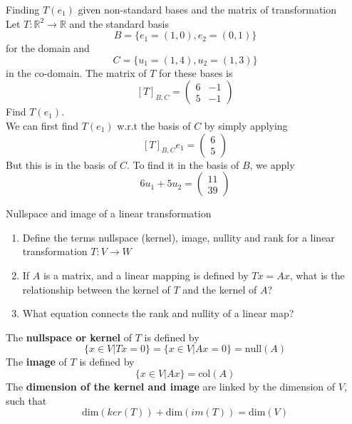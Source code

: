 \documentclass[journal, letterpaper]{IEEEtran}
\begin{document}
    \begin{myboxg}{Finding $T(e_1)$ given non-standard bases and the matrix of transformation} \\
        Let $T : \mathbb{R}^2 \to \mathbb{R}$ and the standard basis 
        $$ B = \{e_1 = (1, 0), e_2 = (0, 1) \}$$ for the domain and
        $$ C = \{u_1 = (1, 4), u_2 = (1, 3) \}$$
        in the co-domain. The matrix of $T$ for these bases is
        $$ [T]_{B, C} = \begin{pmatrix}
            6 & -1 \\5 & -1
        \end{pmatrix}$$
        Find $T(e_1)$.
        \newline \\ 
        We can first find $T(e_1)$ w.r.t the basis of $C$ by simply applying 
        $$ [T]_{B, C} e_1 = \begin{pmatrix}
            6 \\ 5
        \end{pmatrix}$$
        But this is in the basis of $C$. To find it in the basis of $B$, we apply
        $$ 6 u_1 + 5 u_2 = \begin{pmatrix}
            11 \\ 39
        \end{pmatrix}$$
    \end{myboxg}
    \begin{mybox}{Nullspace and image of a linear transformation}
    \begin{enumerate}
        \item Define the terms nullspace (kernel), image, nullity and rank for a linear transformation $T: V \to W$
        \item If $A$ is a matrix, and a linear mapping is defined by $Tx = Ax$, what is the relationship between the kernel of $T$ and the kernel of $A$?
        \item What equation connects the rank and nullity of a linear map?
    \end{enumerate}
    \end{mybox}
    The \textbf{nullspace or kernel} of $T$ is defined by
    $$ \{x \in V | Tx = 0 \} = \{x \in V | Ax = 0 \} = \text{null}(A)$$
    The \textbf{image} of $T$ is defined by
    $$ \{x \in V | Ax \} = \text{col}(A)$$
    The \textbf{dimension of the kernel and image} are linked by the dimension of $V$, such that
    $$ \text{dim}(ker(T)) + \text{dim}(im(T)) = \text{dim}(V)$$
\end{document}
